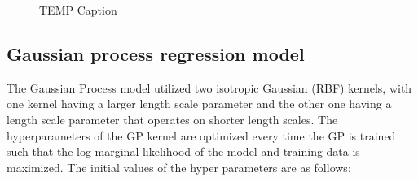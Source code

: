 \begin{figure}[!htb]
\centering
{}
\caption{\label{fig:cv_anal}
TEMP Caption
}
\end{figure}



\subsection{Gaussian process regression model}  %
%
%
The Gaussian Process model utilized two isotropic Gaussian (RBF) kernels, with one kernel having a larger length scale parameter and the other one having a length scale parameter that operates on shorter length scales.
%
The hyperparameters of the GP kernel are optimized every time the GP is trained such that the log marginal likelihood of the model and training data is maximized.
%
The initial values of the hyper parameters are as follows:

